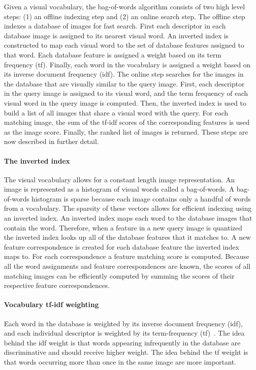         Given a visual vocabulary, the bag-of-words algorithm consists of two high level steps: (1) an offline
        indexing step and (2) an online search step. The offline step indexes a database of images for fast search.
        First each descriptor in each database image is assigned to its nearest visual word. An inverted index is
        constructed to map each visual word to the set of database features assigned to that word. Each database
        feature is assigned a weight based on its term frequency (tf). Finally, each word in the vocabulary is
        assigned a weight based on its inverse document frequency (idf). The online step searches for the images in
        the database that are visually similar to the query image. First, each descriptor in the query image is
        assigned to its visual word, and the term frequency of each visual word in the query image is computed.
        Then, the inverted index is used to build a list of all images that share a visual word with the query. For
        each matching image, the sum of the tf-idf scores of the corresponding features is used as the image score.
        Finally, the ranked list of images is returned. These steps are now described in further detail.

        \paragraph{The inverted index}
            The visual vocabulary allows for a constant length image representation. An image is represented as a
            histogram of visual words called a bag-of-words. A bag-of-words histogram is sparse because each image
            contains only a handful of words from a vocabulary. The sparsity of these vectors allows for efficient
            indexing using an inverted index. An inverted index maps each word to the database images that contain
            the word. Therefore, when a feature in a new query image is quantized the inverted index looks up all
            of the database features that it matches to. A new feature correspondence is created for each database
            feature the inverted index maps to. For each correspondence a feature matching score is computed.
            Because all the word assignments and feature correspondences are known, the scores of all matching
            images can be efficiently computed by summing the scores of their respective feature correspondences.

        \paragraph{Vocabulary tf-idf weighting}
            Each word in the database is weighted by its inverse document frequency (idf), and each individual
            descriptor is weighted by its term-frequency (tf)~\cite{sivic_efficient_2009}. The idea behind the idf
            weight is that words appearing infrequently in the database are discriminative and should receive
            higher weight. The idea behind the tf weight is that words occurring more than once in the same image
            are more important.

